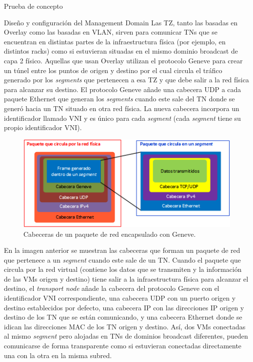 \begin{section}{Prueba de concepto}
\begin{subsection}{Diseño y configuración del Management Domain}
    Las TZ, tanto las basadas en Overlay como las basadas en VLAN, sirven para comunicar TNs que se encuentran en distintas partes de la infraestructura física (por ejemplo, en distintos racks) como si estuvieran situadas en el mismo dominio broadcast de capa 2 físico. 
    Aquellas que usan Overlay utilizan el protocolo Geneve para crear un túnel entre los puntos de origen y destino por el cual circula el tráfico generado por los \textit{segments} que pertenecen a esa TZ y que debe salir a la red física para alcanzar su destino. El protocolo Geneve añade una cabecera UDP a cada paquete Ethernet que generan los \textit{segments} cuando este sale del TN donde se generó hacia un TN situado en otra red física. La nueva cabecera incorpora un identificador llamado VNI y es único para cada \textit{segment} (cada \textit{segment} tiene su propio identificador VNI). 
    \begin{figure}[h]
      \centering
      \includegraphics[width=1\textwidth]{imaxes/pruebaconcepto/FrameGeneve.png}
      \caption{Cabeceras de un paquete de red encapsulado con Geneve.}
      \label{fig:Frame-Geneve-Segment-NSXT}
    \end{figure}
    \FloatBarrier
    En la imagen anterior se muestran las cabeceras que forman un paquete de red que pertenece a un \textit{segment} cuando este sale de un TN. Cuando el paquete que circula por la red virtual (contiene los datos que se transmiten y la información de las VMs origen y destino) tiene salir a la infraestructura física para alcanzar el destino, el \textit{transport node} añade la cabecera del protocolo Geneve con el identificador VNI correspondiente, una cabecera UDP con un puerto origen y destino establecidos por defecto, una cabecera IP con las direcciones IP origen y destino de los TN que se están comunicando, y una cabecera Ethernet donde se idican las direcciones MAC de los TN origen y destino. Así, dos VMs conectadas al mismo \textit{segment} pero alojadas en TNs de dominios broadcast diferentes, pueden comunicarse de forma transparente como si estuvieran conectadas directamente una con la otra en la misma subred.

\end{subsection}
\end{section}

